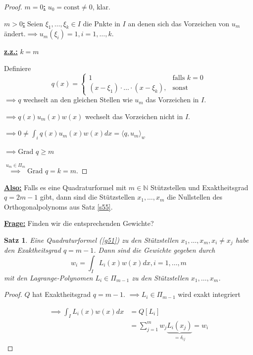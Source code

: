 \documentclass{book}
\newtheorem{theorem}[algorithm]{Satz}
\def\N{\mathbb{N}}
\begin{document}
            \begin{proof}
                \underline{\textbf{$m=0$:}} $u_0=\text{const}\neq 0$, klar.
            
                \underline{\textbf{$m>0$:}} Seien $\xi_1,\dots,\xi_k\in I$ die Pnkte in $I$ an denen sich das Vorzeichen von $u_m$ 
                ändert.$\implies u_m(\xi_i)=1,i=1,\dots,k$.

                \underline{\textbf{z.z.:}} $k=m$

                Definiere 
                \[q(x)=\begin{cases}
                    1&\text{falls } k=0\\
                    (x-\xi_1)\cdot\dots\cdot(x-\xi_k), & \text{sonst}
                \end{cases}\]
                $\implies q$ wechselt an den gleichen Stellen wie $u_m$ das Vorzeichen in $I$.

                $\implies q(x)u_m(x)w(x)$ wechselt das Vorzeichen nicht in $I$. 

                $\implies 0 \neq \int_i q(x)u_m(x)w(x)dx=\langle q,u_m \rangle_w$
                
                $\implies \text{Grad } q\geq m$

                $\stackrel{u_m\in\Pi_m}{\implies} \text{Grad }q =k =m$.
            \end{proof}

            \underline{\textbf{Also:}} Falls es eine Quadraturformel mit $m\in\N$ Stützstellen und Exaktheitsgrad $q=2m-1$
            gibt, dann sind die Stützstellen $x_1,\dots,x_m$ die Nullstellen des Orthogonalpolynoms aus Satz \ref{s55}.

            \underline{\textbf{Frage:}} Finden wir die entsprechenden Gewichte?

            \begin{theorem}\label{s59}
                Eine Quadraturformel (\ref{g51}) zu den Stützstellen $x_1,\dots,x_m,x_i\neq x_j$ habe den Exaktheitsgrad $q=m-1$.
                Dann sind die Gewichte gegeben durch
                \begin{equation}
                    w_i=\int_I L_i(x)w(x)dx,i=1,\dots,m\label{g56}
                \end{equation}
                mit den Lagrange-Polynomen $L_i\in\Pi_{m-1}$ zu den Stützstellen $x_1,\dots,x_m$.
            \end{theorem}

            \begin{proof}
                $Q$ hat Exaktheitsgrad $q=m-1$. $\implies L_i\in\Pi_{m-1}$ wird exakt integriert

                \begin{align*}
                    \implies \int_I L_i(x)w(x)dx&=Q[L_i]\\
                    &=\sum_{j=1}^m w_j\underbrace{L_i(x_j)}_{=\delta_{ij}}=w_i
                \end{align*}
            \end{proof}
\end{document}
